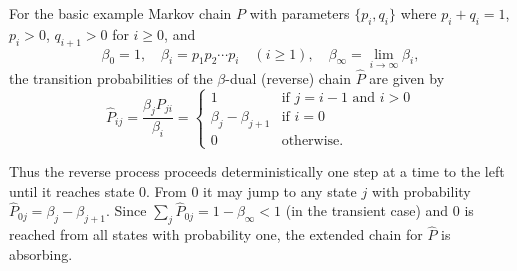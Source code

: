 For the basic example Markov chain $P$ with parameters $\{p_i, q_i\}$ where $p_i + q_i = 1$, $p_i > 0$, $q_{i+1} > 0$ for $i \geq 0$, and
$$\beta_0 = 1, \quad \beta_i = p_1 p_2 \cdots p_i \quad (i \geq 1), \quad \beta_\infty = \lim_{i \to \infty} \beta_i,$$
the transition probabilities of the $\beta$-dual (reverse) chain $\hat{P}$ are given by
$$\hat{P}_{ij} = \frac{\beta_j P_{ji}}{\beta_i} = \begin{cases} 1 & \text{if } j = i-1 \text{ and } i > 0 \\[4pt] \beta_j - \beta_{j+1} & \text{if } i = 0 \\[4pt] 0 & \text{otherwise.} \end{cases}$$

Thus the reverse process proceeds deterministically one step at a time to the left until it reaches state $0$. From $0$ it may jump to any state $j$ with probability $\hat{P}_{0j} = \beta_j - \beta_{j+1}$. Since $\sum_j \hat{P}_{0j} = 1 - \beta_\infty < 1$ (in the transient case) and $0$ is reached from all states with probability one, the extended chain for $\hat{P}$ is absorbing.
